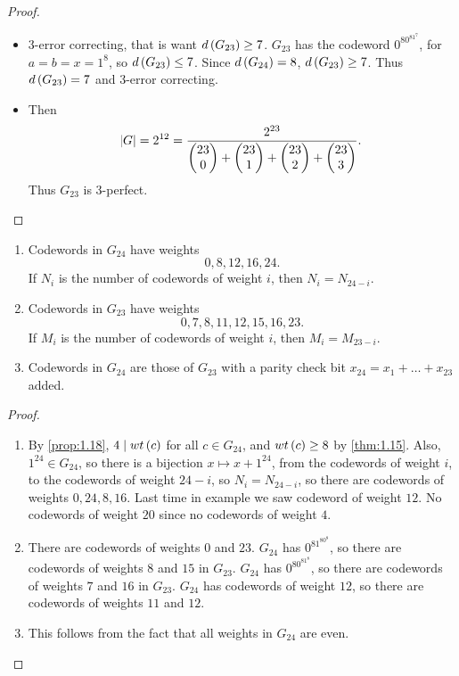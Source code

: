 \begin{proof}
\hfill
\begin{itemize}
\item $ 3 $-error correcting, that is want $ d\br{G_{23}} \ge 7 $. $ G_{23} $ has the codeword $ 0^80^81^7 $, for $ a = b = x = 1^8 $, so $ d\br{G_{23}} \le 7 $. Since $ d\br{G_{24}} = 8 $, $ d\br{G_{23}} \ge 7 $. Thus $ d\br{G_{23}} = 7 $ and $ 3 $-error correcting.
\item Then
$$ \abs{G} = 2^{12} = \dfrac{2^{23}}{\begin{pmatrix} 23 \\ 0 \end{pmatrix} + \begin{pmatrix} 23 \\ 1 \end{pmatrix} + \begin{pmatrix} 23 \\ 2 \end{pmatrix} + \begin{pmatrix} 23 \\ 3 \end{pmatrix}}. $$
Thus $ G_{23} $ is $ 3 $-perfect.
\end{itemize}
\end{proof}

\begin{proposition}
\hfill
\begin{enumerate}
\item Codewords in $ G_{24} $ have weights
$$ 0, 8, 12, 16, 24. $$
If $ N_i $ is the number of codewords of weight $ i $, then $ N_i = N_{24 - i} $.
\item Codewords in $ G_{23} $ have weights
$$ 0, 7, 8, 11, 12, 15, 16, 23. $$
If $ M_i $ is the number of codewords of weight $ i $, then $ M_i = M_{23 - i} $.
\item Codewords in $ G_{24} $ are those of $ G_{23} $ with a parity check bit $ x_{24} = x_1 + \dots + x_{23} $ added.
\end{enumerate}
\end{proposition}

\begin{proof}
\hfill
\begin{enumerate}
\item By \ref{prop:1.18}, $ 4 \mid wt\br{c} $ for all $ c \in G_{24} $, and $ wt\br{c} \ge 8 $ by \ref{thm:1.15}. Also, $ 1^{24} \in G_{24} $, so there is a bijection $ x \mapsto x + 1^{24} $, from the codewords of weight $ i $, to the codewords of weight $ 24 - i $, so $ N_i = N_{24 - i} $, so there are codewords of weights $ 0, 24, 8, 16 $. Last time in example we saw codeword of weight $ 12 $. No codewords of weight $ 20 $ since no codewords of weight $ 4 $.
\item There are codewords of weights $ 0 $ and $ 23 $. $ G_{24} $ has $ 0^81^80^8 $, so there are codewords of weights $ 8 $ and $ 15 $ in $ G_{23} $. $ G_{24} $ has $ 0^80^81^8 $, so there are codewords of weights $ 7 $ and $ 16 $ in $ G_{23} $. $ G_{24} $ has codewords of weight $ 12 $, so there are codewords of weights $ 11 $ and $ 12 $.
\item This follows from the fact that all weights in $ G_{24} $ are even.
\end{enumerate}
\end{proof}

